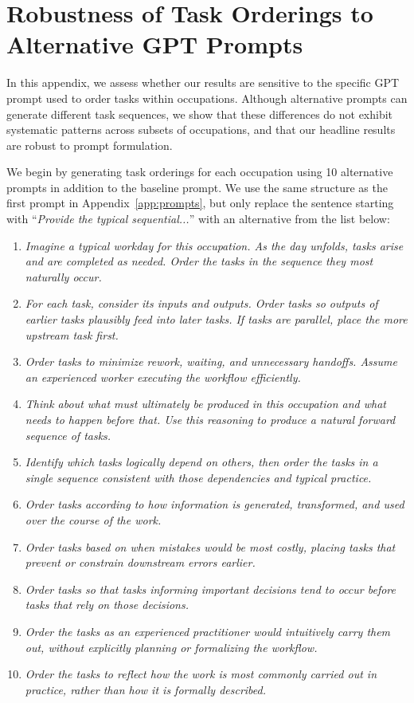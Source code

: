 \section{Robustness of Task Orderings to Alternative GPT Prompts}
\label{app:gptPrompts_robustness}

\renewcommand{\thefigure}{I.\arabic{figure}}
\setcounter{figure}{0}

In this appendix, we assess whether our results are sensitive to the specific GPT prompt used to order tasks within occupations.  
Although alternative prompts can generate different task sequences, we show that these differences do not exhibit systematic patterns across subsets of occupations, and that our headline results are robust to prompt formulation.

We begin by generating task orderings for each occupation using 10 alternative prompts in addition to the baseline prompt.
We use the same structure as the first prompt in Appendix~\ref{app:prompts}, but only replace the sentence starting with ``\textit{Provide the typical sequential...}'' with an alternative from the list below:
\begin{enumerate}
    \item \small \textit{Imagine a typical workday for this occupation. As the day unfolds, tasks arise and are completed as needed. Order the tasks in the sequence they most naturally occur.}
    \item \small \textit{For each task, consider its inputs and outputs. Order tasks so outputs of earlier tasks plausibly feed into later tasks. If tasks are parallel, place the more upstream task first.}
    \item \small \textit{Order tasks to minimize rework, waiting, and unnecessary handoffs. Assume an experienced worker executing the workflow efficiently.}
    \item \small \textit{Think about what must ultimately be produced in this occupation and what needs to happen before that. Use this reasoning to produce a natural forward sequence of tasks.}
    \item \small \textit{Identify which tasks logically depend on others, then order the tasks in a single sequence consistent with those dependencies and typical practice.}
    \item \small \textit{Order tasks according to how information is generated, transformed, and used over the course of the work.}
    \item \small \textit{Order tasks based on when mistakes would be most costly, placing tasks that prevent or constrain downstream errors earlier.}
    \item \small \textit{Order tasks so that tasks informing important decisions tend to occur before tasks that rely on those decisions.}
    \item \small \textit{Order the tasks as an experienced practitioner would intuitively carry them out, without explicitly planning or formalizing the workflow.}
    \item \small \textit{Order the tasks to reflect how the work is most commonly carried out in practice, rather than how it is formally described.}
\end{enumerate}
